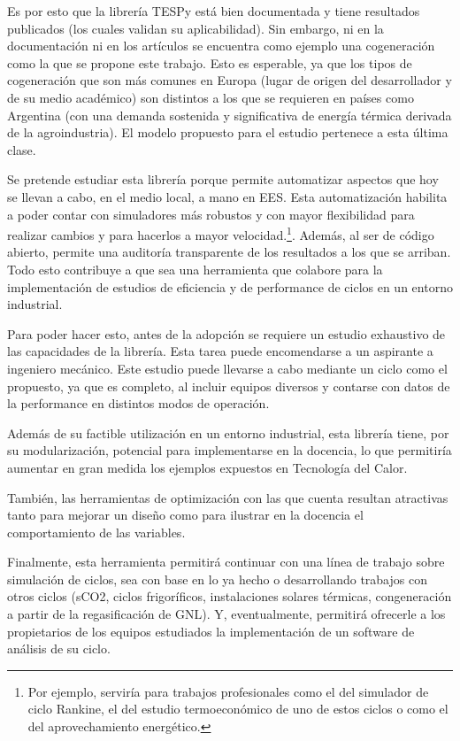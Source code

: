 \documentclass[a4paper]{article}
\begin{document}
Es por esto que la librería TESPy está bien documentada y tiene resultados publicados (los cuales validan su aplicabilidad). Sin embargo, ni en la documentación ni en los artículos se encuentra como ejemplo una cogeneración como la que se propone este trabajo. Esto es esperable, ya que los tipos de cogeneración que son más comunes en Europa (lugar de origen del desarrollador y de su medio académico) son distintos a los que se requieren en países como Argentina (con una demanda sostenida y significativa de energía térmica derivada de la agroindustria). El modelo propuesto para el estudio pertenece a esta última clase.

Se pretende estudiar esta librería porque permite automatizar aspectos que hoy se llevan a cabo, en el medio local, a mano en EES. Esta automatización habilita a poder contar con simuladores más robustos y con mayor flexibilidad para realizar cambios y para hacerlos a mayor velocidad.\footnote{Por ejemplo, serviría para trabajos profesionales como el del simulador de ciclo Rankine, el del estudio termoeconómico de uno de estos ciclos o como el del aprovechamiento energético.}. Además, al ser de código abierto, permite una auditoría transparente de los resultados a los que se arriban. Todo esto contribuye a que sea una herramienta que colabore para la implementación de estudios de eficiencia y de performance de ciclos en un entorno industrial.

Para poder hacer esto, antes de la adopción se requiere un estudio exhaustivo de las capacidades de la librería. Esta tarea puede encomendarse a un aspirante a ingeniero mecánico. Este estudio puede llevarse a cabo mediante un ciclo como el propuesto, ya que es completo, al incluir equipos diversos y contarse con datos de la performance en distintos modos de operación.

Además de su factible utilización en un entorno industrial, esta librería tiene, por su modularización, potencial para implementarse en la docencia, lo que permitiría aumentar en gran medida los ejemplos expuestos en Tecnología del Calor. 

También, las herramientas de optimización con las que cuenta resultan atractivas tanto para mejorar un diseño como para ilustrar en la docencia el comportamiento de las variables.

Finalmente, esta herramienta permitirá continuar con una línea de trabajo sobre simulación de ciclos, sea con base en lo ya hecho o desarrollando trabajos con otros ciclos (sCO2, ciclos frigoríficos, instalaciones solares térmicas, congeneración a partir de la regasificación de GNL). Y, eventualmente, permitirá ofrecerle a los propietarios de los equipos estudiados la implementación de un software de análisis de su ciclo.
\end{document}
